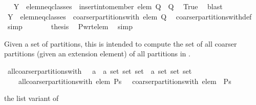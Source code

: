 \begin{isabellebody}
\ \isamarkupfalse%
\ {\isachardoublequoteopen}{\isacharbraceleft}Y{\isacharbraceright}\ {\isasymunion}\ {\isacharquery}elem{\isacharunderscore}neq{\isacharunderscore}classes\ {\isasymin}\ insert{\isacharunderscore}into{\isacharunderscore}member\ elem\ {\isacharquery}Q\ {\isacharbackquote}\ {\isacharquery}Q{\isachardoublequoteclose}\ \isamarkupfalse%
\ True\ \isamarkupfalse%
\ blast\isanewline
\ \ \ \ \isamarkupfalse%
\ \isamarkupfalse%
\ {\isachardoublequoteopen}{\isacharbraceleft}Y{\isacharbraceright}\ {\isasymunion}\ {\isacharquery}elem{\isacharunderscore}neq{\isacharunderscore}classes\ {\isasymin}\ coarser{\isacharunderscore}partitions{\isacharunderscore}with\ elem\ {\isacharquery}Q{\isachardoublequoteclose}\ \isamarkupfalse%
\ coarser{\isacharunderscore}partitions{\isacharunderscore}with{\isacharunderscore}def\ \isamarkupfalse%
\ simp\isanewline
\ \ \ \ \isamarkupfalse%
\ \isamarkupfalse%
\ {\isacharquery}thesis\ \isamarkupfalse%
\ P{\isacharunderscore}wrt{\isacharunderscore}elem\ \isamarkupfalse%
\ simp\isanewline
\ \ \isamarkupfalse%
\isanewline
{}\isamarkupfalse%
%
\endisatagproof
{\isafoldproof}%
%
\isadelimproof
%
\endisadelimproof
%
\begin{isamarkuptext}%
Given a set  of partitions, this is intended to compute the set of all coarser
  partitions (given an extension element) of all partitions in .%
\end{isamarkuptext}%
\isamarkuptrue%
\isamarkupfalse%
\ all{\isacharunderscore}coarser{\isacharunderscore}partitions{\isacharunderscore}with\ {\isacharcolon}{\isacharcolon}\ {\isachardoublequoteopen}\ {\isacharprime}a\ {\isasymRightarrow}\ {\isacharprime}a\ set\ set\ set\ {\isasymRightarrow}\ {\isacharprime}a\ set\ set\ set{\isachardoublequoteclose}\isanewline
\ \ \ \ {\isachardoublequoteopen}all{\isacharunderscore}coarser{\isacharunderscore}partitions{\isacharunderscore}with\ elem\ Ps\ {\isacharequal}\ {\isasymUnion}\ {\isacharparenleft}coarser{\isacharunderscore}partitions{\isacharunderscore}with\ elem\ {\isacharbackquote}\ Ps{\isacharparenright}{\isachardoublequoteclose}%
\begin{isamarkuptext}%
the list variant of %
\end{isamarkuptext}%

\end{isabellebody}
